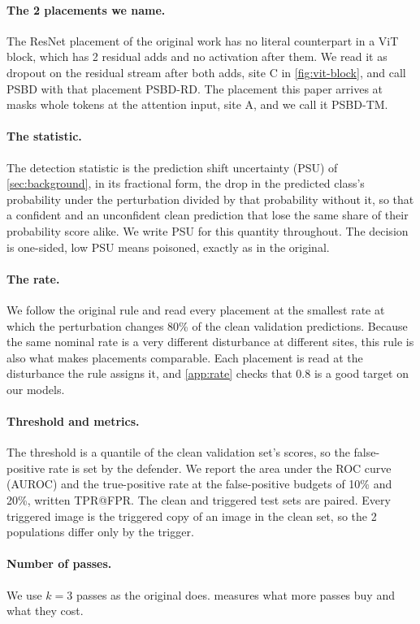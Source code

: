 \paragraph{The 2 placements we name.}
The ResNet placement of the original work has no literal counterpart in a ViT block, which has 2 residual adds and no activation after them. We read it as dropout on the residual stream after both adds, site C in \cref{fig:vit-block}, and call PSBD with that placement PSBD-RD. The placement this paper arrives at masks whole tokens at the attention input, site A, and we call it PSBD-TM.

\paragraph{The statistic.}
The detection statistic is the prediction shift uncertainty (PSU) of \cref{sec:background}, in its fractional form, the drop in the predicted class's probability under the perturbation divided by that probability without it, so that a confident and an unconfident clean prediction that lose the same share of their probability score alike. We write PSU for this quantity throughout. The decision is one-sided, low PSU means poisoned, exactly as in the original.

\paragraph{The rate.}
We follow the original rule and read every placement at the smallest rate at which the perturbation changes 80\% of the clean validation predictions. Because the same nominal rate is a very different disturbance at different sites, this rule is also what makes placements comparable. Each placement is read at the disturbance the rule assigns it, and \cref{app:rate} checks that 0.8 is a good target on our models.

\paragraph{Threshold and metrics.}
The threshold is a quantile of the clean validation set's scores, so the false-positive rate is set by the defender. We report the area under the ROC curve (AUROC) and the true-positive rate at the false-positive budgets of 10\% and 20\%, written TPR@FPR. The clean and triggered test sets are paired. Every triggered image is the triggered copy of an image in the clean set, so the 2 populations differ only by the trigger.

\paragraph{Number of passes.}
We use $k = 3$ passes as the original does.  measures what more passes buy and what they cost.
